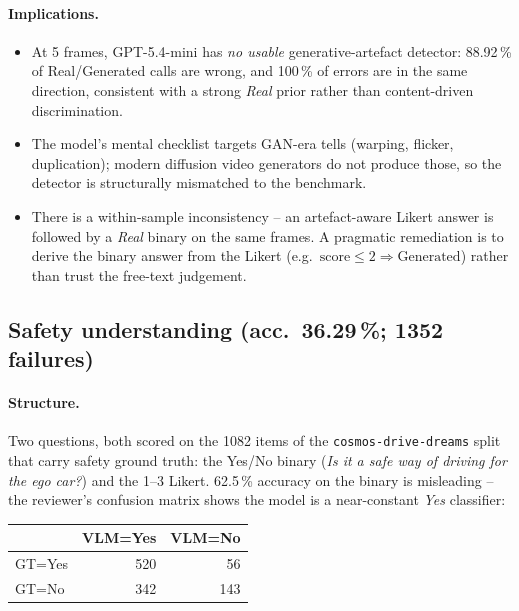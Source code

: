 \documentclass[11pt,a4paper]{article}
\newcommand{\pct}[1]{#1\,\%}
\newcommand{\code}[1]{\texttt{#1}}
\begin{document}
\paragraph{Implications.}
\begin{itemize}
  \item At 5 frames, GPT-5.4-mini has \emph{no usable} generative-artefact
  detector: \pct{88.92} of Real/Generated calls are wrong, and 100\,\% of
  errors are in the same direction, consistent with a strong
  \emph{Real} prior rather than content-driven discrimination.
  \item The model's mental checklist targets GAN-era tells (warping,
  flicker, duplication); modern diffusion video generators do not
  produce those, so the detector is structurally mismatched to the
  benchmark.
  \item There is a within-sample inconsistency -- an artefact-aware
  Likert answer is followed by a \emph{Real} binary on the same
  frames. A pragmatic remediation is to derive the binary answer from
  the Likert (e.g.~\(\text{score}\leq 2 \Rightarrow \text{Generated}\))
  rather than trust the free-text judgement.
\end{itemize}

\subsection{Safety understanding (acc.~\pct{36.29}; \num{1352} failures)}
\label{sec:safety}

\paragraph{Structure.} Two questions, both scored on the 1082 items
of the \code{cosmos-drive-dreams} split that carry safety ground
truth: the Yes/No binary (\emph{Is it a safe way of driving for the
ego car?}) and the 1--3 Likert. \pct{62.5} accuracy on the binary is
misleading -- the reviewer's confusion matrix shows the model is a
near-constant \emph{Yes} classifier:

\medskip
\begin{center}
\begin{tabular}{lrr}
\toprule
 & VLM=Yes & VLM=No \\
\midrule
GT=Yes & 520 & 56  \\
GT=No  & 342 & 143 \\
\bottomrule
\end{tabular}
\end{center}
\medskip
\end{document}
